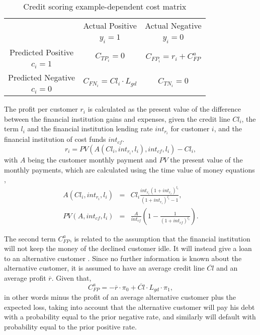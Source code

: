   \begin{table}
  \caption{Credit scoring example-dependent cost matrix}\label{table_costmat2}
    \centering
    \begin{tabular}{c|c|c}
      \multicolumn{1}{c|}{}  & Actual Positive& Actual Negative \\
      \multicolumn{1}{c|}{} & $y_i=1$& $y_i=0$ \\
      \hline
      Predicted Positive& \multirow{ 2}{*}{$C_{TP_i}=0$} & \multirow{2}{*}{$C_{FP_i}=r_i+C^a_{FP}$} 
      \\
      $c_i=1$ & &\\
      \hline
      Predicted Negative& \multirow{ 2}{*}{$C_{FN_i}=Cl_i \cdot L_{gd}$} & \multirow{
      2}{*}{$C_{TN_i}=0$} \\
      $c_i=0$ & &\\
    \end{tabular}
  \end{table}
  
  The profit per customer $r_i$ is calculated as the present value of the difference between the 
  financial institution gains and expenses, given the credit line $Cl_i$, the term $l_i$ and the 
  financial institution lending rate $int_{r_i}$ for customer $i$, and the financial institution 
  of cost funds $int_{cf}$.
  \begin{equation}
    r_i= PV(A(Cl_i,int_{r_i},l_i),int_{cf},l_i)-Cl_i,
  \end{equation}
  with $A$ being the customer monthly payment and $PV$ the present value of the monthly payments,
  which are calculated using the time value of money equations \citep{Lawrence2012},
  \begin{eqnarray}
    A(Cl_i,int_{r_i},l_i) &=&  Cl_i \frac{int_{r_i}(1+int_{r_i})^{l_i}}{(1+int_{r_i})^{l_i}-1}, \\
    PV(A,int_{cf},l_i) &=& \frac{A}{int_{cf}} \left(1-\frac{1}{(1+int_{cf})^{l_i}} \right).
  \end{eqnarray}
    
  The second term $C^a_{FP}$, is related to the assumption that the financial institution will not 
  keep the money of the declined customer idle. It will instead give a loan to an alternative 
  customer \citep{Nayak1997}. Since no further information is known about the alternative customer, 
  it is assumed to have an average credit line $\overline{Cl}$ and an average profit $\overline{r}$.
  Given that, 
  \begin{equation}
    C^a_{FP}=- \overline{r} \cdot \pi_0+\overline{Cl}\cdot L_{gd} \cdot \pi_1,
  \end{equation}
  in other words minus the profit of an average alternative customer plus the expected loss, 
  taking into account that the alternative customer will pay his debt with a probability equal to 
  the prior negative rate, and similarly will default with probability equal to the prior positive 
  rate.

